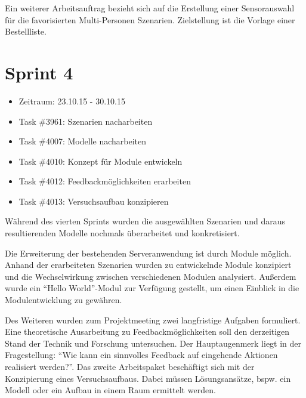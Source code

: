 \documentclass[12pt, oneside, smallheadings]{scrbook}
\begin{document}
Ein weiterer Arbeitsauftrag bezieht sich auf die Erstellung einer Sensorauswahl für die favorisierten Multi-Personen Szenarien. Zielstellung ist die Vorlage einer Bestellliste.

\section{Sprint 4}
\begin{itemize}
	\item Zeitraum: 23.10.15 - 30.10.15 \newline
	\item Task \#3961: Szenarien nacharbeiten
	\item Task \#4007: Modelle nacharbeiten
	\item Task \#4010: Konzept für Module entwickeln
	\item Task \#4012: Feedbackmöglichkeiten erarbeiten
	\item Task \#4013: Versuchsaufbau konzipieren\\
\end{itemize}
\noindent
Während des vierten Sprints wurden die ausgewählten Szenarien und daraus resultierenden Modelle nochmals überarbeitet und konkretisiert.

Die Erweiterung der bestehenden Serveranwendung ist durch Module möglich. Anhand der erarbeiteten Szenarien wurden zu entwickelnde Module konzipiert und die Wechselwirkung zwischen verschiedenen Modulen analysiert. Außerdem wurde ein "`Hello World"'-Modul zur Verfügung gestellt, um einen Einblick in die Modulentwicklung zu gewähren.

Des Weiteren wurden zum Projektmeeting zwei langfristige Aufgaben formuliert. Eine theoretische Ausarbeitung zu Feedbackmöglichkeiten soll den derzeitigen Stand der Technik und Forschung untersuchen. Der Hauptaugenmerk liegt in der Fragestellung: "`Wie kann ein sinnvolles Feedback auf eingehende Aktionen realisiert werden?"'. Das zweite Arbeitspaket beschäftigt sich mit der Konzipierung eines Versuchsaufbaus. Dabei müssen Lösungsansätze, bspw. ein Modell oder ein Aufbau in einem Raum ermittelt werden.
\end{document}
